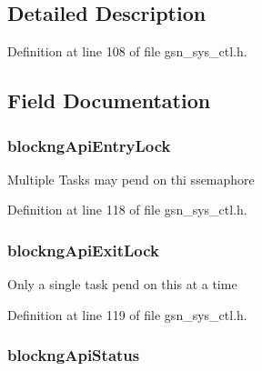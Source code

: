 \subsection{Detailed Description}


Definition at line 108 of file gsn\_\-sys\_\-ctl.h.



\subsection{Field Documentation}
\hypertarget{a00248_a1375db10dcc5c2669543b8bdea7c9294}{
\subsubsection[{blockngApiEntryLock}]{ {\bf blockngApiEntryLock}}}
\label{a00248_a1375db10dcc5c2669543b8bdea7c9294}
Multiple Tasks may pend on thi ssemaphore 

Definition at line 118 of file gsn\_\-sys\_\-ctl.h.

\hypertarget{a00248_ad31b28c2c1d66a49676adefa0939184e}{
\subsubsection[{blockngApiExitLock}]{ {\bf blockngApiExitLock}}}
\label{a00248_ad31b28c2c1d66a49676adefa0939184e}
Only a single task pend on this at a time 

Definition at line 119 of file gsn\_\-sys\_\-ctl.h.

\hypertarget{a00248_a9058d044509dc3901de07c426d816472}{
\subsubsection[{blockngApiStatus}]{ {\bf blockngApiStatus}}}
\label{a00248_a9058d044509dc3901de07c426d816472}


